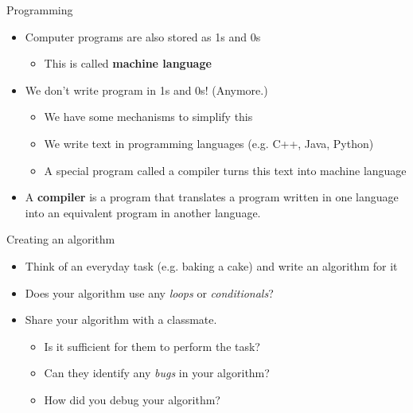 \documentclass[aspectratio=169]{beamer}
\begin{document}
\begin{frame}{Programming}
    \begin{itemize}[label=--]
        \item Computer programs are also stored as 1s and 0s
            \begin{itemize}[label=\(\blacktriangleright\),itemsep=5pt]
                \item This is called \textbf{machine language}
            \end{itemize}
        \item We don't write program in 1s and 0s! (Anymore.)
            \begin{itemize}[label=\(\blacktriangleright\),itemsep=5pt]
                \item We have some mechanisms to simplify this
                \item We write text in programming languages (e.g. C++, Java, Python)
                \item A special program called a compiler turns this text into machine language
            \end{itemize}
        \item A \textbf{compiler} is a program that translates a program written in one language into an equivalent program in another language.
    \end{itemize}
\end{frame}


\begin{frame}{Creating an algorithm}
    \begin{itemize}[label=--]
        \item Think of an everyday task (e.g. baking a cake) and write an algorithm for it
        \item Does your algorithm use any \textit{loops} or \textit{conditionals}?
        \item Share your algorithm with a classmate.
            \begin{itemize}[label=\(\blacktriangleright\),itemsep=5pt]
                \item Is it sufficient for them to perform the task?
                \item Can they identify any \textit{bugs} in your algorithm?
                \item How did you debug your algorithm?
            \end{itemize}
    \end{itemize}
\end{frame}
\end{document}
